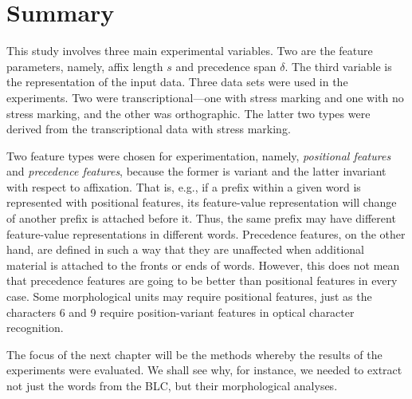 
\section{Summary}

This study involves three main experimental variables. Two are the feature parameters, namely, affix length $s$ and precedence span $\delta$. The third variable is the representation of the input data. Three data sets were used in the experiments. Two were transcriptional---one with stress marking and one with no stress marking, and the other was orthographic. The latter two types were derived from the transcriptional data with stress marking. 

Two feature types were chosen for experimentation, namely, \emph{positional features} and \emph{precedence features},
because the former is variant and the latter invariant with respect to affixation. That is, e.g., if a prefix within a given word is represented with positional features, its feature-value representation will change of another prefix is attached before it. Thus, the same prefix may have different feature-value representations in different words. Precedence features, on the other hand, are defined in such a way that they are unaffected when additional material is attached to the fronts or ends of words. However, this does not mean that precedence features are going to be better than positional features in every case. Some morphological units may require positional features, just as the characters 6 and 9 require position-variant features in optical character recognition. 

The focus of the next chapter will be the methods whereby the results of the experiments were evaluated. We shall see why, for instance, we needed to extract not just the words from the BLC, but their morphological analyses. 